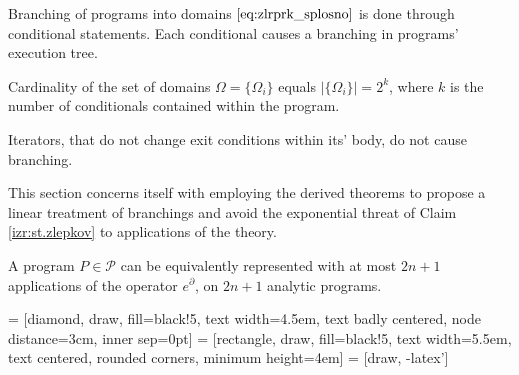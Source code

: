 \documentclass[smallcondensed]{svjour3}
\newcommand{\dP}{\mathcal{P}}
\newcommand{\D}{\partial}
\begin{document}
Branching of programs into domains $\eqref{eq:zlrprk_splosno}$ is done through conditional statements. Each conditional causes a branching in programs' execution tree.

\begin{proposition}\label{izr:st.zlepkov}
Cardinality of the set of domains $\Omega=\{\Omega_i\}$ equals $\lvert\{\Omega_i \}\rvert=2^k$, where $k$ is the number of conditionals contained within the program.
\end{proposition}
\begin{remark}
Iterators, that do not change exit conditions within its' body, do not cause branching.
\end{remark}

This section concerns itself with employing the derived theorems to propose a linear treatment of branchings and avoid the exponential threat of Claim \ref{izr:st.zlepkov} to applications of the theory.

\begin{theorem}
A program $P\in\dP$ can be equivalently represented with at most $2n+1$ applications of the operator $e^\D$, on $2n+1$ analytic programs.
\end{theorem}









 = [diamond, draw, fill=black!5, 
    text width=4.5em, text badly centered, node distance=3cm, inner sep=0pt]
 = [rectangle, draw, fill=black!5, 
    text width=5.5em, text centered, rounded corners, minimum height=4em]
 = [draw, -latex']
\end{document}
